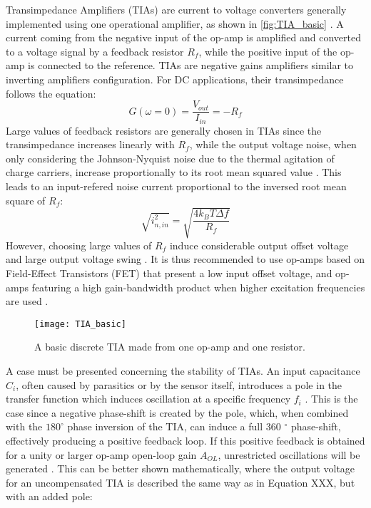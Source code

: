 Transimpedance Amplifiers (TIAs) are current to voltage converters generally implemented using one operational amplifier, as shown in \autoref{fig:TIA_basic} \cite{horowitz1989art}. A current coming from the negative input of the op-amp is amplified and converted to a voltage signal by a feedback resistor $R_f$, while the positive input of the op-amp is connected to the reference. TIAs are negative gains amplifiers similar to inverting amplifiers configuration. For DC applications, their transimpedance follows the equation: 
\begin{equation}
\label{eq:TIA_simple}
G(\omega=0)=\frac{V_{out}}{I_{in}} = -R_f
\end{equation}
Large values of feedback resistors are generally chosen in TIAs since the transimpedance increases linearly with $R_f$, while the output voltage noise, when only considering  the Johnson-Nyquist noise due to the thermal agitation of charge carriers, increase proportionally to its root mean squared value \cite{horowitz1989art}. This leads to an input-refered noise current proportional to the inversed root mean square of $R_f$: 
\begin{equation}
\sqrt{i_{n,in}^2}=\sqrt{\frac{4 k_B T \Delta f}{R_f}}
\end{equation}
However, choosing large values of $R_f$ induce considerable output offset voltage and large output voltage swing \cite{horowitz1989art}. It is thus recommended to use op-amps based on Field-Effect Transistors (FET) that present a low input offset voltage, and op-amps featuring a high gain-bandwidth product when higher excitation frequencies are used \cite{horowitz1989art}. \par
\begin{figure}[h]
    \centering
    \texttt{[image: TIA\_basic]}
    \caption{A basic discrete TIA made from one op-amp and one resistor.}
    \label{fig:TIA_basic}
\end{figure}
A case must be presented concerning the stability of TIAs. An input capacitance $C_i$, often caused by parasitics or by the sensor itself, introduces a pole in the transfer function which induces oscillation at a specific frequency $f_i$ \cite{horowitz1989art}. This is the case since a negative phase-shift is created by the pole, which, when combined with the $180^{\circ}$ phase inversion of the TIA, can induce a full 360 $^{\circ}$ phase-shift, effectively producing a positive feedback loop. If this positive feedback is obtained for a unity or larger op-amp open-loop gain $A_{OL}$, unrestricted oscillations will be generated \cite{horowitz1989art}. This can be better shown mathematically, where the output voltage for an uncompensated TIA is described the same way as in Equation XXX, but with an added pole:
